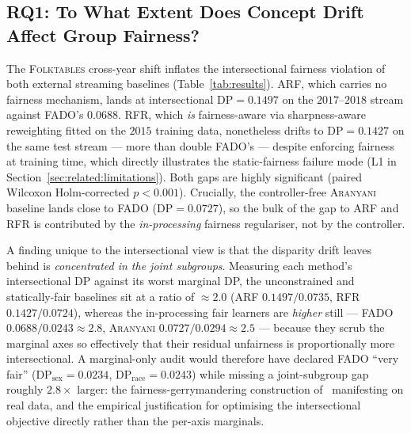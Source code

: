 \documentclass[sigconf,anonymous,review]{acmart}
\begin{document}
\subsection{RQ1: To What Extent Does Concept Drift Affect Group Fairness?}
\label{sec:results:rq1}
The \textsc{Folktables} cross-year shift inflates the intersectional fairness violation of both external streaming baselines (Table~\ref{tab:results}).
\textsc{ARF}, which carries no fairness mechanism, lands at intersectional $\mathrm{DP}=0.1497$ on the $2017$--$2018$ stream against \textsc{FADO}'s $0.0688$.
\textsc{RFR}, which \emph{is} fairness-aware via sharpness-aware reweighting fitted on the $2015$ training data, nonetheless drifts to $\mathrm{DP}=0.1427$ on the
same test stream --- more than double \textsc{FADO}'s --- despite enforcing fairness at training time, which directly illustrates the static-fairness failure mode
(L1 in Section~\ref{sec:related:limitations}). Both gaps are highly significant (paired Wilcoxon Holm-corrected $p<0.001$). Crucially, the controller-free
\textsc{Aranyani} baseline lands close to \textsc{FADO} ($\mathrm{DP}=0.0727$), so the bulk of the gap to \textsc{ARF} and \textsc{RFR} is contributed by the
\emph{in-processing} fairness regulariser, not by the controller.

A finding unique to the intersectional view is that the disparity drift leaves behind is \emph{concentrated in the joint subgroups}. Measuring each method's
intersectional DP against its worst marginal DP, the unconstrained and statically-fair baselines sit at a ratio of $\approx\!2.0$ (\textsc{ARF} $0.1497/0.0735$,
\textsc{RFR} $0.1427/0.0724$), whereas the in-processing fair learners are \emph{higher} still --- \textsc{FADO} $0.0688/0.0243\approx2.8$, \textsc{Aranyani}
$0.0727/0.0294\approx2.5$ --- because they scrub the marginal axes so effectively that their residual unfairness is proportionally more intersectional. A
marginal-only audit would therefore have declared \textsc{FADO} ``very fair'' ($\mathrm{DP}_{\text{sex}}{=}0.0234$, $\mathrm{DP}_{\text{race}}{=}0.0243$) while
missing a joint-subgroup gap roughly $2.8\times$ larger: the fairness-gerrymandering construction of~\cite{kearns2018gerrymandering} manifesting on real data, and
the empirical justification for optimising the intersectional objective directly rather than the per-axis marginals.
\end{document}

